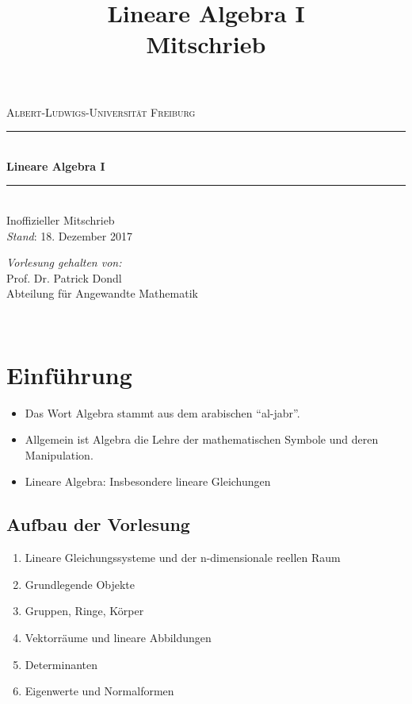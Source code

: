 \documentclass{report}
\title{Lineare Algebra I\\Mitschrieb}
\theoremstyle{customrem}
\theoremstyle{customdef}
\begin{document}
\begin{titlepage}
	\newcommand{\HRule}{\rule{\linewidth}{0.5mm}}
	\center
	\vspace{6cm}
	\textsc{\large Albert-Ludwigs-Universität Freiburg}\\[0.5cm] 
	\vspace{4cm}
	\HRule \\[0.8cm]
	{ \Huge  \textbf{Lineare Algebra $\mathbf{I}$}}\\[0.4cm] 
	\HRule \\[.5cm]
	{\Large Inoffizieller Mitschrieb}\\[1.0cm]
	\textsl{Stand}: 18. Dezember 2017
	\\[12.5cm]
	\begin{minipage}{0.5\textwidth}
		\begin{center} \large
			\textsl{Vorlesung gehalten von:}\\[1cm]
			Prof. Dr. Patrick Dondl\\
			Abteilung für Angewandte Mathematik\\
		\end{center}
	\end{minipage}\\[2.5cm]
	\thispagestyle{empty}
\end{titlepage}


\section*{Einführung}
\begin{itemize}
\item{Das Wort Algebra stammt aus dem arabischen "`al-jabr"'.}
\item{Allgemein ist Algebra die Lehre der mathematischen Symbole und deren Manipulation.}
\item{Lineare Algebra: Insbesondere lineare Gleichungen}
\end{itemize}

\subsection*{Aufbau der Vorlesung}
\begin{enumerate}
\item{Lineare Gleichungssysteme und der n-dimensionale reellen Raum}
\item{Grundlegende Objekte}
\item{Gruppen, Ringe, Körper}
\item{Vektorräume und lineare Abbildungen}
\item{Determinanten}
\item{Eigenwerte und Normalformen}
\end{enumerate}
\end{document}
